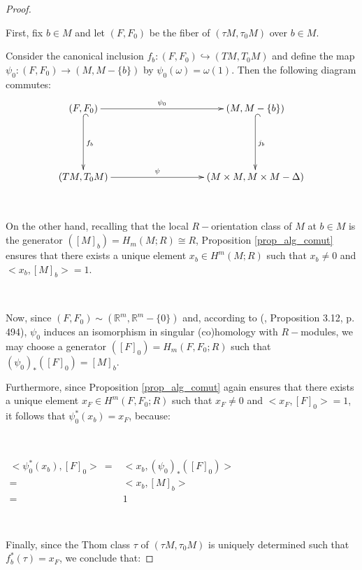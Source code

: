 \documentclass[12pt,oneside]{book}
\newcommand{\R}{\mathbb{R}}
\begin{document}
    \begin{proof}

        \

        First, fix $b\in M$ and let $(F,F_{0})$ be the fiber of $(\tau M,\tau_{0}M)$ over $b\in M$.
        
        Consider the canonical inclusion $f_{b}:(F,F_{0})\hookrightarrow (TM,T_{0}M)$ and define the map 
        $\psi_{0}:(F,F_{0})\to (M,M-\{b\})$ by $\psi_{0}(\omega)=\omega(1)$. Then the following diagram commutes:
        $$ \xymatrix @C=0.5cm {
            (F,F_{0}) \ar[rrrrr]^-{\psi_{0}} \ar@{^(->}[dd]^-{f_{b}} &&&&& (M,M-\{b\}) \ar@{^(->}[dd]^-{j_{b}} \\
            &&&&& \\		 		
            (TM,T_{0}M) \ar[rrrrr]^-{\psi} &&&&& (M\times M,M\times M-\Delta)
        } $$

        \

        On the other hand, recalling that the local $R-$orientation class of $M$ at $b\in M$ is the generator 
        $([M]_{b})=H_{m}(M;R)\cong R$, Proposition \ref{prop_alg_comut} ensures that there exists a unique element $x_{b}\in H^{m}(M;R)$ such 
        that $x_{b}\neq 0$ and $<x_{b},[M]_{b}>=1$.

        \

        Now, since $(F,F_{0})\sim (\R^{m},\R^{m}-\{0\})$ and, according to (\cite{fadell_1}, Proposition 3.12, p. 494), $\psi_{0}$ induces an 
        isomorphism in singular (co)homology with $R-$modules, we may choose a generator 
        $([F]_{0})=H_{m}(F,F_{0};R)$ such that $(\psi_{0})_{*}([F]_{0})=[M]_{b}$.

        Furthermore, since Proposition \ref{prop_alg_comut} again ensures that there exists a unique element $x_{F}\in H^{m}(F,F_{0};R)$ such 
        that $x_{F}\neq 0$ and $<x_{F},[F]_{0}>=1$, it follows that $\psi_{0}^{*}(x_{b})=x_{F}$, because:

        \
        
        $\begin{array}{rl}
            <\psi_{0}^{*}(x_{b}),[F]_{0}> \ = & <x_{b},(\psi_{0})_{*}([F]_{0})> \\
            = & <x_{b},[M]_{b}> \\
            = & 1
        \end{array}$

        \

        Finally, since the Thom class $\tau$ of $(\tau M,\tau_{0}M)$ is uniquely determined such that $f_{b}^{*}(\tau)=x_{F}$, we conclude that:


\end{proof}
\end{document}
